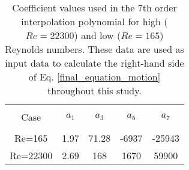 \begin{table}[ht]

\begin{center}
\setlength{\unitlength}{\textwidth}

\begin{tabular}{c c c c c} %
\hline\hline %
\\[0.2ex]
Case & $a_1$ & $a_3$ & $a_5$ & $a_7$ \\ [0.8ex] %
\hline 
\\[0.8ex]%
Re=165 & 1.97 & 71.28  & -6937 & -25943  \\[0.8ex] %
Re=22300 & 2.69 & 168 & 1670 & 59900 \\ [1ex] %
\hline %
\end{tabular}

\caption{Coefficient values used in the 7th order interpolation polynomial for high ($Re=22300$) and low ($Re=165$) Reynolds numbers. These data are used as input data to calculate the right-hand side of Eq. \ref{final_equation_motion} throughout this study.}
 
\label{table:cy-coefficients} %
\end{center}
\end{table}

